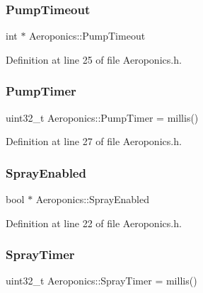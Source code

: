 \subsubsection{\texorpdfstring{Pump\+Timeout}{PumpTimeout}}
{\footnotesize\ttfamily int $\ast$ Aeroponics\+::\+Pump\+Timeout\hspace{0.3cm}{\ttfamily [protected]}}



Definition at line 25 of file Aeroponics.\+h.

\mbox{\label{class_aeroponics_a366eb8d09ed862b4f69c6e4fbc13553f}} 
\subsubsection{\texorpdfstring{Pump\+Timer}{PumpTimer}}
{\footnotesize\ttfamily uint32\+\_\+t Aeroponics\+::\+Pump\+Timer = millis()\hspace{0.3cm}{\ttfamily [protected]}}



Definition at line 27 of file Aeroponics.\+h.

\mbox{\label{class_aeroponics_ab54b25994276061212bd3e0e47871704}} 
\subsubsection{\texorpdfstring{Spray\+Enabled}{SprayEnabled}}
{\footnotesize\ttfamily bool $\ast$ Aeroponics\+::\+Spray\+Enabled\hspace{0.3cm}{\ttfamily [protected]}}



Definition at line 22 of file Aeroponics.\+h.

\mbox{\label{class_aeroponics_af90abc43bd0a70431a1be41e87889813}} 
\subsubsection{\texorpdfstring{Spray\+Timer}{SprayTimer}}
{\footnotesize\ttfamily uint32\+\_\+t Aeroponics\+::\+Spray\+Timer = millis()\hspace{0.3cm}{\ttfamily [protected]}}



